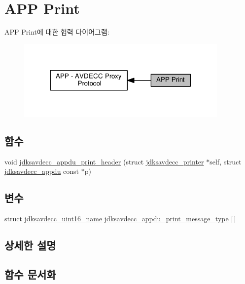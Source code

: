 \hypertarget{group__app__print}{}\section{A\+PP Print}
\label{group__app__print}
A\+PP Print에 대한 협력 다이어그램\+:
\nopagebreak
\begin{figure}[H]
\begin{center}
\leavevmode
\includegraphics[width=293pt]{group__app__print}
\end{center}
\end{figure}
\subsection*{함수}
\begin{DoxyCompactItemize}
\item 
void \hyperlink{group__app__print_ga0181e0ff0a30d202cd45f2f414a8c575}{jdksavdecc\+\_\+appdu\+\_\+print\+\_\+header} (struct \hyperlink{structjdksavdecc__printer}{jdksavdecc\+\_\+printer} $\ast$self, struct \hyperlink{structjdksavdecc__appdu}{jdksavdecc\+\_\+appdu} const $\ast$p)
\end{DoxyCompactItemize}
\subsection*{변수}
\begin{DoxyCompactItemize}
\item 
struct \hyperlink{structjdksavdecc__uint16__name}{jdksavdecc\+\_\+uint16\+\_\+name} \hyperlink{group__app__print_gacf0a940a6c4ba23d14ff138ab52dbc45}{jdksavdecc\+\_\+appdu\+\_\+print\+\_\+message\+\_\+type} \mbox{[}$\,$\mbox{]}
\end{DoxyCompactItemize}


\subsection{상세한 설명}


\subsection{함수 문서화}
